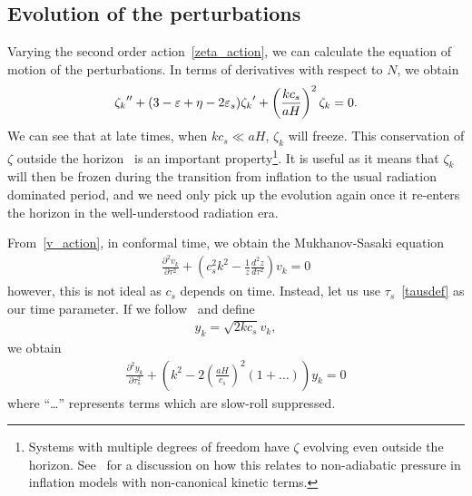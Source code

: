     \subsection{Evolution of the perturbations}\label{pert_evol}
    Varying the second order action~\eqref{zeta_action}, we can calculate the equation of motion
    of the perturbations.
    In terms of derivatives with respect to $N$, we obtain
    \begin{align}\label{modefneqn_zeta_N}
        {\zeta_k}'' + (3-\varepsilon+\eta-2\varepsilon_{s}){\zeta_k}'+\left(\frac{kc_s}{aH}\right)^2\zeta_k=0.
    \end{align}
    We can see that at late times, when $kc_s\ll aH$, $\zeta_k$ will freeze.
    This conservation of $\zeta$ outside the horizon~\cite{Lyth_conserved} is an
    important property\footnote{
    Systems with multiple degrees of freedom have $\zeta$ evolving even outside
    the horizon. See~\cite{Christopherson_2009} for a discussion on how this relates
    to non-adiabatic pressure in inflation models with non-canonical kinetic terms.}.
    It is useful as it means that $\zeta_k$ will then be frozen during the transition from inflation to the
    usual radiation dominated period, and we need only pick up the evolution again once it
    re-enters the horizon in the well-understood radiation era.


    From~\eqref{v_action}, in conformal time, we obtain the Mukhanov-Sasaki equation
    \begin{align}\label{modefneqn_tau}
        \frac{\partial^2 v_k}{\partial \tau^2} + \left(c_s^2k^2 - \frac{1}{z}\frac{d^2 z}{d \tau^2}\right)v_k = 0
    \end{align}
    however, this is not ideal as $c_s$ depends on time.
    Instead, let us use $\tau_s$~\eqref{tausdef} as our time parameter.
    If we follow~\cite{Hu_2011} and define
    \begin{align}\label{y_defn}
        y_k=\sqrt{2kc_s}v_k,
    \end{align}
    we obtain
    \begin{align}\label{modefneqn_tau_s}
        \frac{\partial^2 y_k}{\partial \tau_s^2} + \left(k^2 - 2\left(\frac{aH}{c_s}\right)^2(1+\ldots)\right)y_k = 0
    \end{align}
    where ``\ldots'' represents terms which are slow-roll suppressed.


